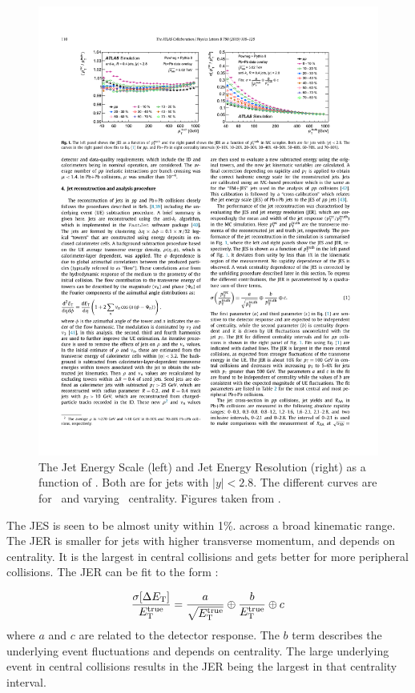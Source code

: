 \begin{figure}[htbp!]
	\centering
	\includegraphics[width=\textwidth]{figures/setup/jes_jer} %
	\caption{
	The Jet Energy Scale (left) and Jet Energy Resolution (right) as a function of \pttruth.
	Both are for jets with $|y| < 2.8$. The different curves are for \pp\ and varying \pbpb\ centrality.
	Figures taken from \cite{2019108}.}	
	\label{fig:jes_jer}%
\end{figure}
The JES is seen to be almost unity within 1\%. across a broad kinematic range.
The JER is smaller for jets with higher transverse momentum, and depends on centrality.
It is the largest in central collisions and gets better for more peripheral collisions.
The JER can be fit to the form \cite{Aad:hi_jets}:

\begin{align}
\frac{\sigma[\Delta \mbox{$E_{\mathrm{T}}$}]}{E_{\rm T}^{\rm true}} = \frac{a}{\sqrt{E_{\rm T}^{\rm true}}} \oplus \frac{b}{E_{\rm T}^{\rm true}} \oplus c
\end{align}
where $a$ and $c$ are related to the detector response.
The $b$ term describes the underlying event fluctuations and depends on centrality.
The large underlying event in central collisions results in the JER being the largest in that centrality interval. 
